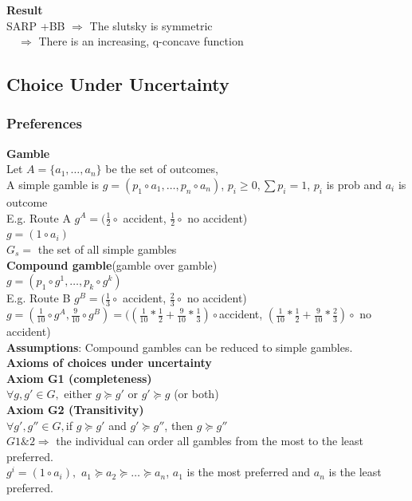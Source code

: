 \documentclass[letterpaper,13pt,single,pdftex]{scrartcl}
\begin{document}
\textbf{Result}\\
 SARP +BB $\Rightarrow$ The slutsky is symmetric\\ $\quad\Rightarrow$ There is an increasing, q-concave function

\newpage
\subsection{Choice Under Uncertainty}
\subsubsection{Preferences}

\textbf{Gamble}\\
Let $A = \{a_1, \dots, a_n \}$ be the set of outcomes, \\
A simple gamble is $g=(p_1 \circ a_1, \dots, p_n\circ a_n)$, $p_i \ge 0, \sum p_i = 1$, $p_i$ is prob and $a_i$ is outcome \\
E.g. Route A $g^A = (\frac{1}{2} \circ$ accident, $\frac{1}{2}\circ$ no accident)\\
$g = (1 \circ a_i)$\\
$G_s =$ the set of all simple gambles\\

\textbf{Compound gamble}(gamble over gamble)\\
$g = (p_1 \circ g^1, \dots, p_k\circ g^k)$\\
E.g. Route B
$g^B = (\frac{1}{3} \circ$ accident, $\frac{2}{3}\circ$ no accident)
$g = (\frac{1}{10}\circ g^A,\frac{9}{10}\circ g^B) = ((\frac{1}{10}*\frac{1}{2}+\frac{9}{10}*\frac{1}{3})\circ$accident, $(\frac{1}{10}*\frac{1}{2}+\frac{9}{10}*\frac{2}{3})\circ$ no accident)\\
\textbf{Assumptions}: Compound gambles can be reduced to simple gambles. \\

\textbf{Axioms of choices under uncertainty}\\
    \textbf{Axiom G1 (completeness)}\\
$\forall g, g' \in G, $ either $g \succeq g'$ or $ g'\succeq g$ (or both)\\
\textbf{Axiom G2 (Transitivity)}\\
$ \forall g', g'' \in G, $if $g\succeq g'$ and $g'\succeq g''$, then $g\succeq g''$\\

$G1\&2 \Rightarrow$ the individual can order all gambles from the most to the least preferred. \\
$g^i = (1 \circ a_i), $ $a_1 \succeq a_2\succeq\dots\succeq a_n$, $a_1$ is the most preferred and $a_n$ is the least preferred. \\
\end{document}
